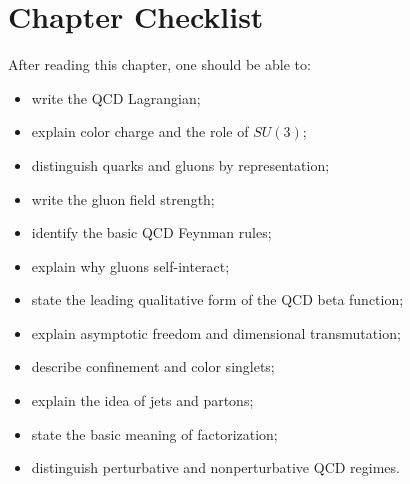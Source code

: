 \section{Chapter Checklist}

After reading this chapter, one should be able to:
\begin{itemize}
    \item write the QCD Lagrangian;
    \item explain color charge and the role of \(SU(3)\);
    \item distinguish quarks and gluons by representation;
    \item write the gluon field strength;
    \item identify the basic QCD Feynman rules;
    \item explain why gluons self-interact;
    \item state the leading qualitative form of the QCD beta function;
    \item explain asymptotic freedom and dimensional transmutation;
    \item describe confinement and color singlets;
    \item explain the idea of jets and partons;
    \item state the basic meaning of factorization;
    \item distinguish perturbative and nonperturbative QCD regimes.
\end{itemize}
